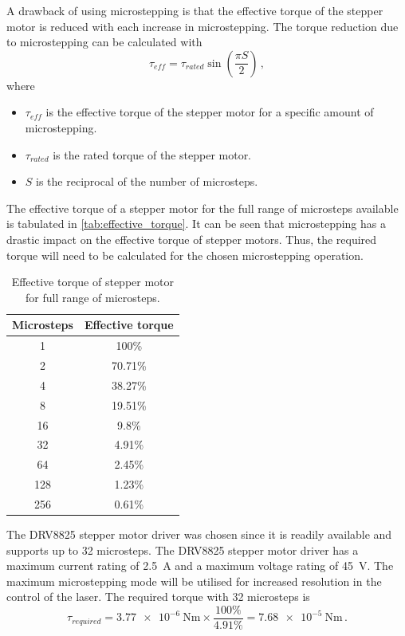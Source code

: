 A drawback of using microstepping is that the effective torque of the stepper motor is reduced with each increase in microstepping. The torque reduction due to microstepping can be calculated with
\begin{equation}
  \tau_{eff} = \tau_{rated} \sin \left(\frac{\pi S}{2}\right)\,,
\end{equation}
where
\begin{itemize}
  \item $\tau_{eff}$ is the effective torque of the stepper motor for a specific amount of microstepping.
  \item $\tau_{rated}$ is the rated torque of the stepper motor.
  \item $S$ is the reciprocal of the number of microsteps.
\end{itemize}

The effective torque of a stepper motor for the full range of microsteps available is tabulated in \autoref{tab:effective_torque}. It can be seen that microstepping has a drastic impact on the effective torque of stepper motors. Thus, the required torque will need to be calculated for the chosen microstepping operation.
\begin{table}[!htb]
  \centering
  \begin{tabular}{|c|c|}
    \hline
    Microsteps & Effective torque \\
    \hline
    1          & 100\%            \\
    2          & 70.71\%          \\
    4          & 38.27\%          \\
    8          & 19.51\%          \\
    16         & 9.8\%            \\
    32         & 4.91\%           \\
    64         & 2.45\%           \\
    128        & 1.23\%           \\
    256        & 0.61\%           \\
    \hline
  \end{tabular}
  \caption{Effective torque of stepper motor for full range of microsteps.}
  \label{tab:effective_torque}
\end{table}

The DRV8825 stepper motor driver was chosen since it is readily available and supports up to 32 microsteps. The DRV8825 stepper motor driver has a maximum current rating of 2.5~A and a maximum voltage rating of 45~V. The maximum microstepping mode will be utilised for increased resolution in the control of the laser. The required torque with 32 microsteps is
\begin{equation}
  \tau_{required} = \SI{3.77e-6}{\newton\meter} \times \frac{100\%}{4.91\%} = \SI{7.68e-5}{\newton\meter}\,.
\end{equation}

